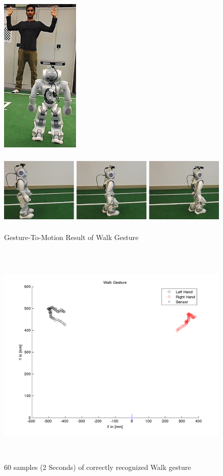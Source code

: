 \begin{figure}
	[h] 
	\begin{minipage}
		{1 
		\textwidth} \centering 
		\includegraphics[height=75mm]{figures/result/usr-walk.png} \caption*{} 
	\end{minipage}
	\begin{minipage}
		{1 
		\textwidth} 
		\includegraphics[height=42mm]{figures/result/nao-gm-walk.png} \caption*{} 
	\end{minipage}
	\caption{Gesture-To-Motion Result of Walk Gesture} \label{res:gm:walk} 
\end{figure}
\begin{figure}
	[h] \centering 
	\includegraphics[height=110mm]{figures/result/test-walk.png} \caption{60 samples (2 Seconds) of correctly recognized Walk gesture} 
	\label{res:pl:walk}
\end{figure}
